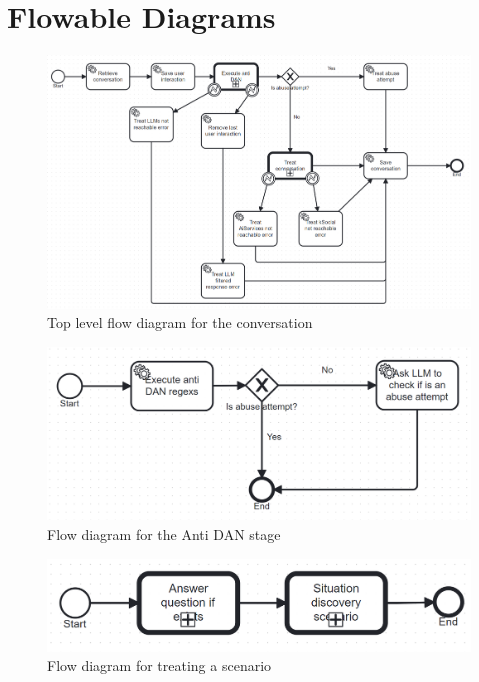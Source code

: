 \documentclass[a4paper,12pt,twoside]{ThesisStyle}
\begin{document}
\backmatter

% 





\appendix


\chapter{Flowable Diagrams}
\label{cap:flowable_diagrams}

\begin{figure}[H]
  \centering
  \includegraphics[width=1\textwidth]{imatges/Conversation_process.bpmn20.png}
  \caption{Top level flow diagram for the conversation}
  \label{fig:conversation}
\end{figure}

\begin{figure}[H]
  \centering
  \includegraphics[width=1\textwidth]{imatges/Execute_anti_DAN.bpmn20.png}
  \caption{Flow diagram for the Anti DAN stage}
  \label{fig:antidan}
\end{figure}

\begin{figure}[H]
  \centering
  \includegraphics[width=1\textwidth]{imatges/Treat_conversation_scenario.bpmn20.png}
  \caption{Flow diagram for treating a scenario}
  \label{fig:treatscenario}
\end{figure}
\end{document}
